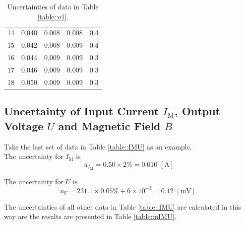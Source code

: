 \documentclass[a4paper]{article}
\begin{document}
\begin{table}[H]
\begin{tabular}{crrrc}
		14 & 0.040                          & 0.008                   & 0.008               & 0.4                                            \\
		15 & 0.042                          & 0.008                   & 0.009               & 0.4                                            \\
		16 & 0.044                          & 0.009                   & 0.009               & 0.3                                            \\
		17 & 0.046                          & 0.009                   & 0.009               & 0.3                                            \\
		18 & 0.050                          & 0.009                   & 0.009               & 0.3                                            \\
		\hline
	\end{tabular}
	\caption{Uncertainties of data in Table \ref{table::e1}.}
	\label{table::ue1}
\end{table}

\subsection{Uncertainty of Input Current $I_\text{M}$, Output Voltage $U$ and Magnetic Field $B$}

Take the last set of data in Table \ref{table::IMU} as an example.\\

The uncertainty for $I_\text{M}$ is
$$u_{I_\text{M}} = 0.50\times 2\% = 0.010\,\,[\text{A}]$$

The uncertainty for $U$ is
$$u_U = 231.1\times 0.05\%+6\times10^{-3} = 0.12\,\,[\text{mV}].$$

The uncertainties of all other data in Table \ref{table::IMU} are calculated in this way are the results are presented in Table \ref{table::uIMU}.
\end{document}
